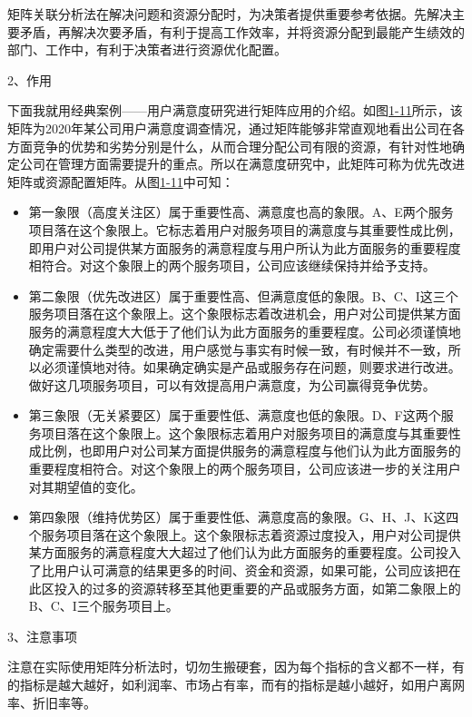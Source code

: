 矩阵关联分析法在解决问题和资源分配时，为决策者提供重要参考依据。先解决主要矛盾，再解决次要矛盾，有利于提高工作效率，并将资源分配到最能产生绩效的部门、工作中，有利于决策者进行资源优化配置。

2、作用

下面我就用经典案例——用户满意度研究进行矩阵应用的介绍。如图\href{figure:1-11}{1-11}所示，该矩阵为2020年某公司用户满意度调查情况，通过矩阵能够非常直观地看出公司在各方面竞争的优势和劣势分别是什么，从而合理分配公司有限的资源，有针对性地确定公司在管理方面需要提升的重点。所以在满意度研究中，此矩阵可称为优先改进矩阵或资源配置矩阵。从图\href{figure:1-11}{1-11}中可知：

\begin{itemize}
    \item 第一象限（高度关注区）属于重要性高、满意度也高的象限。A、E两个服务项目落在这个象限上。它标志着用户对服务项目的满意度与其重要性成比例，即用户对公司提供某方面服务的满意程度与用户所认为此方面服务的重要程度相符合。对这个象限上的两个服务项目，公司应该继续保持并给予支持。
    \item 第二象限（优先改进区）属于重要性高、但满意度低的象限。B、C、I这三个服务项目落在这个象限上。这个象限标志着改进机会，用户对公司提供某方面服务的满意程度大大低于了他们认为此方面服务的重要程度。公司必须谨慎地确定需要什么类型的改进，用户感觉与事实有时候一致，有时候并不一致，所以必须谨慎地对待。如果确定确实是产品或服务存在问题，则要求进行改进。做好这几项服务项目，可以有效提高用户满意度，为公司赢得竞争优势。
    \item 第三象限（无关紧要区）属于重要性低、满意度也低的象限。D、F这两个服务项目落在这个象限上。这个象限标志着用户对服务项目的满意度与其重要性成比例，也即用户对公司某方面提供服务的满意程度与他们认为此方面服务的重要程度相符合。对这个象限上的两个服务项目，公司应该进一步的关注用户对其期望值的变化。
    \item 第四象限（维持优势区）属于重要性低、满意度高的象限。G、H、J、K这四个服务项目落在这个象限上。这个象限标志着资源过度投入，用户对公司提供某方面服务的满意程度大大超过了他们认为此方面服务的重要程度。公司投入了比用户认可满意的结果更多的时间、资金和资源，如果可能，公司应该把在此区投入的过多的资源转移至其他更重要的产品或服务方面，如第二象限上的B、C、I三个服务项目上。
\end{itemize}

3、注意事项

注意在实际使用矩阵分析法时，切勿生搬硬套，因为每个指标的含义都不一样，有的指标是越大越好，如利润率、市场占有率，而有的指标是越小越好，如用户离网率、折旧率等。

